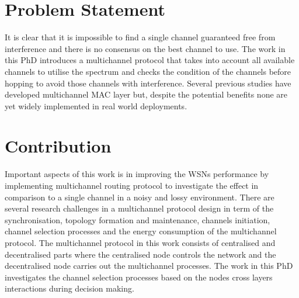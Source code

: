 
\section{Problem Statement}
It is clear that it is impossible to find a single channel guaranteed free from interference and there is no consensus on the best channel to use. The work in this PhD introduces a multichannel protocol that takes into account all available channels to utilise the spectrum and checks the condition of the channels before hopping to avoid those channels with interference. Several previous studies have developed multichannel MAC layer but, despite the potential benefits none are yet widely implemented in real world deployments.

\section{Contribution}
Important aspects of this work is in improving the WSNs performance by implementing multichannel routing protocol to investigate the effect in comparison to a single channel in a noisy and lossy environment. There are several research challenges in a multichannel protocol design in term of the synchronisation, topology formation and maintenance, channels initiation, channel selection processes and the energy consumption of the multichannel protocol. The multichannel protocol in this work consists of centralised and decentralised parts where the centralised node controls the network and the decentralised node carries out the multichannel processes. The work in this PhD investigates the channel selection processes based on the nodes cross layers interactions during decision making.



